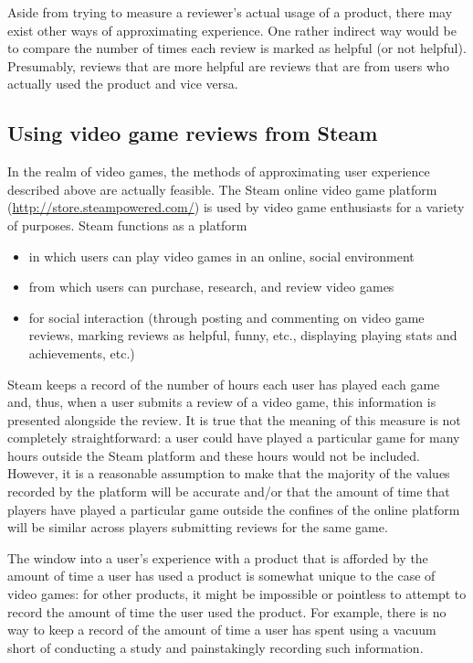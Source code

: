 \documentclass[9pt]{article}
\begin{document}
Aside from trying to measure a reviewer's actual usage of a product, there may exist other ways of approximating experience. One rather indirect way would be to compare the number of times each review is marked as helpful (or not helpful). Presumably, reviews that are more helpful are reviews that are from users who actually used the product and vice versa.

\subsection{Using video game reviews from Steam}
\label{ssec:steam}

In the realm of video games, the methods of approximating user experience described above are actually feasible. The Steam online video game platform (\url{http://store.steampowered.com/}) is used by video game enthusiasts for a variety of purposes. Steam functions as a platform

\begin{itemize}
\item in which users can play video games in an online, social environment
\item from which users can purchase, research, and review video games
\item for social interaction (through posting and commenting on video game reviews, marking reviews as helpful, funny, etc., displaying playing stats and achievements, etc.)
\end{itemize}

Steam keeps a record of the number of hours each user has played each game and, thus, when a user submits a review of a video game, this information is presented alongside the review. It is true that the meaning of this measure is not completely straightforward: a user could have played a particular game for many hours outside the Steam platform and these hours would not be included. However, it is a reasonable assumption to make that the majority of the values recorded by the platform will be accurate and/or that the amount of time that players have played a particular game outside the confines of the online platform will be similar across players submitting reviews for the same game.

The window into a user's experience with a product that is afforded by the amount of time a user has used a product is somewhat unique to the case of video games: for other products, it might be impossible or pointless to attempt to record the amount of time the user used the product. For example, there is no way to keep a record of the amount of time a user has spent using a vacuum short of conducting a study and painstakingly recording such information.
\end{document}
